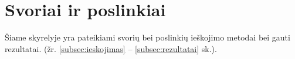 \section{Svoriai ir poslinkiai}

Šiame skyrelyje yra pateikiami svorių bei poslinkių ieškojimo metodai bei gauti rezultatai. (žr. \ref{subsec:ieskojimas} – \ref{subsec:rezultatai} sk.).


